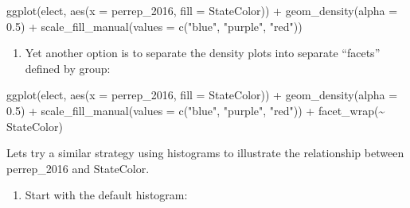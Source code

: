 \documentclass[
  letterpaper,
  DIV=11,
  numbers=noendperiod]{scrreprt}
\newenvironment{Shaded}{\begin{snugshade}}{\end{snugshade}}
\newcommand{\AttributeTok}[1]{\textcolor[rgb]{0.40,0.45,0.13}{#1}}
\newcommand{\FloatTok}[1]{\textcolor[rgb]{0.68,0.00,0.00}{#1}}
\newcommand{\FunctionTok}[1]{\textcolor[rgb]{0.28,0.35,0.67}{#1}}
\newcommand{\NormalTok}[1]{\textcolor[rgb]{0.00,0.23,0.31}{#1}}
\newcommand{\SpecialCharTok}[1]{\textcolor[rgb]{0.37,0.37,0.37}{#1}}
\newcommand{\StringTok}[1]{\textcolor[rgb]{0.13,0.47,0.30}{#1}}
\providecommand{\tightlist}{%
  \setlength{\itemsep}{0pt}\setlength{\parskip}{0pt}}\usepackage{longtable,booktabs,array}
\begin{document}
\begin{Shaded}
\begin{Highlighting}[]
\FunctionTok{ggplot}\NormalTok{(elect, }\FunctionTok{aes}\NormalTok{(}\AttributeTok{x =}\NormalTok{ perrep\_2016, }\AttributeTok{fill =}\NormalTok{ StateColor)) }\SpecialCharTok{+}
  \FunctionTok{geom\_density}\NormalTok{(}\AttributeTok{alpha =} \FloatTok{0.5}\NormalTok{) }\SpecialCharTok{+}
  \FunctionTok{scale\_fill\_manual}\NormalTok{(}\AttributeTok{values =} \FunctionTok{c}\NormalTok{(}\StringTok{"blue"}\NormalTok{, }\StringTok{"purple"}\NormalTok{, }\StringTok{"red"}\NormalTok{))}
\end{Highlighting}
\end{Shaded}

\begin{enumerate}
\def\labelenumi{\alph{enumi}.}
\setcounter{enumi}{3}
\tightlist
\item
  Yet another option is to separate the density plots into separate
  ``facets'' defined by group:
\end{enumerate}

\begin{Shaded}
\begin{Highlighting}[]
\FunctionTok{ggplot}\NormalTok{(elect, }\FunctionTok{aes}\NormalTok{(}\AttributeTok{x =}\NormalTok{ perrep\_2016, }\AttributeTok{fill =}\NormalTok{ StateColor)) }\SpecialCharTok{+}
  \FunctionTok{geom\_density}\NormalTok{(}\AttributeTok{alpha =} \FloatTok{0.5}\NormalTok{) }\SpecialCharTok{+}
  \FunctionTok{scale\_fill\_manual}\NormalTok{(}\AttributeTok{values =} \FunctionTok{c}\NormalTok{(}\StringTok{"blue"}\NormalTok{, }\StringTok{"purple"}\NormalTok{, }\StringTok{"red"}\NormalTok{)) }\SpecialCharTok{+}
  \FunctionTok{facet\_wrap}\NormalTok{(}\SpecialCharTok{\textasciitilde{}}\NormalTok{ StateColor)}
\end{Highlighting}
\end{Shaded}

\begin{Shaded}
\begin{Highlighting}[]
\NormalTok{Let\textquotesingle{}s try a similar strategy using histograms to illustrate the relationship between \textasciigrave{}perrep\_2016\textasciigrave{} and \textasciigrave{}StateColor\textasciigrave{}.    }
\end{Highlighting}
\end{Shaded}

\begin{enumerate}
\def\labelenumi{\alph{enumi}.}
\tightlist
\item
  Start with the default histogram:
\end{enumerate}
\end{document}
